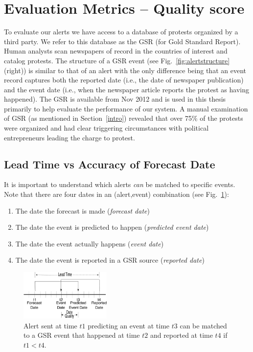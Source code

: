 \section{Evaluation Metrics -- Quality score}
To evaluate our alerts we have access to a database of protests organized by a third party. We refer to this database as the
GSR (for Gold Standard Report). Human analysts scan newspapers of record in the countries of interest and catalog
protests. The structure of a GSR event (see Fig.~\ref{fig:alertstructure} (right)) is similar to that of an alert with
the only difference being that an event record captures both the reported date (i.e., the date of newspaper publication)
and the event date (i.e., when the newspaper article reports the protest as having happened).
The GSR is available from Nov 2012 
and is used in this thesis primarily to 
help evaluate the performance of our system. A manual examination of GSR (as mentioned in Section~\ref{intro}) revealed
that over 75\% of the protests were organized and had clear triggering circumstances with political entrepreneurs leading the
charge to protest.

\subsection{Lead Time vs Accuracy of Forecast Date}
It is important to understand which alerts {\it can} be matched to specific events.
Note that there are four dates in an (alert,event) combination (see Fig.~\ref{fig:timeline}):
\begin{enumerate}
\item The date the forecast is made ({\it forecast date})
\item The date the event is predicted to happen ({\it predicted event date})
\item The date the event actually happens ({\it event date})
\item The date the event is reported in a GSR source ({\it reported date})
\end{enumerate}

\begin{figure}[t]
\centering
\includegraphics[width=0.40\textwidth]{figures/timeline}
\caption[Timeline depicting lead-time vs date accuracy]{Alert sent at time $t1$ predicting an event at time $t3$
can be matched to a GSR event that happened at time $t2$ and reported
at time $t4$ if $t1 < t4$.}
\label{fig:timeline}
\end{figure}


